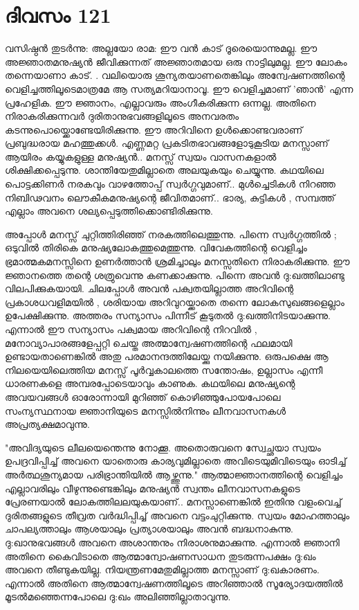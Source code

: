  
\section{ദിവസം 121}


വസിഷ്ഠന്‍ തുടര്‍ന്നു: അല്ലയോ രാമ: ഈ വന്‍ കാട്‌ ദൂരെയൊന്നുമല്ല. ഈ അജ്ഞാതമനുഷ്യന്‍ ജീവിക്കുന്നത്‌ അജ്ഞാതമായ ഒരു നാട്ടിലുമല്ല. ഈ ലോകം തന്നെയാണാ കാട്‌. . വലിയൊരു ശൂന്യതയാണതെങ്കിലും അന്വേഷണത്തിന്റെ വെളിച്ചത്തിലൂടെമാത്രമേ ആ സത്യമറിയാനാവൂ. ഈ വെളിച്ചമാണ്‌ 'ഞാന്‍' എന്ന പ്രഹേളിക. ഈ ജ്ഞാനം, എല്ലാവരും അംഗീകരിക്കുന്ന ഒന്നല്ല. അതിനെ നിരാകരിക്കുന്നവര്‍ ദുരിതാനുഭവങ്ങളിലൂടെ അനവരതം കടന്നുപൊയ്ക്കൊണ്ടേയിരിക്കുന്നു. ഈ അറിവിനെ ഉള്‍ക്കൊണ്ടവരാണ്‌ പ്രബുദ്ധരായ മഹത്തുക്കള്‍.   എണ്ണമറ്റ പ്രകടിതഭാവങ്ങളോടുകൂടിയ മനസ്സാണ്‌ ആയിരം കയ്യുകളുള്ള മനുഷ്യന്‍.. മനസ്സ്‌ സ്വയം വാസനകളാല്‍ ശിക്ഷിക്കപ്പെടുന്നു. ശാന്തിയേതുമില്ലാതെ അലയുകയും ചെയ്യുന്നു. കഥയിലെ പൊട്ടക്കിണര്‍ നരകവും വാഴത്തോപ്പ്‌ സ്വര്‍ഗ്ഗവുമാണ്‌.. മുള്‍ച്ചെടികള്‍ നിറഞ്ഞ നിബിഢവനം ലൌകീകമനുഷ്യന്റെ ജീവിതമാണ്‌.. ഭാര്യ, കുട്ടികള്‍ , സമ്പത്ത്‌ എല്ലാം അവനെ ശല്യപ്പെടുത്തിക്കൊണ്ടിരിക്കുന്നു.

അപ്പോള്‍ മനസ്സ്‌ ചുറ്റിത്തിരിഞ്ഞ്‌ നരകത്തിലെത്തുന്നു. പിന്നെ സ്വര്‍ഗ്ഗത്തില്‍ ; ഒടുവില്‍ തിരികെ മനുഷ്യലോകത്തുമെത്തുന്നു. വിവേകത്തിന്റെ വെളിച്ചം ഭ്രമാത്മകമനസ്സിനെ ഉണര്‍ത്താന്‍ ശ്രമിച്ചാലും മനസ്സതിനെ നിരാകരിക്കുന്നു. ഈ ജ്ഞാനത്തെ തന്റെ ശത്രുവെന്നു കണക്കാക്കുന്നു. പിന്നെ അവന്‍ ദു:ഖത്തിലാണ്ടു വിലപിക്കുകയായി. ചിലപ്പോള്‍ അവന്‍ പക്വതയില്ലാത്ത അറിവിന്റെ പ്രകാശധവളിമയില്‍ , ശരിയായ അറിവുറയ്ക്കാതെ തന്നെ ലോകസുഖങ്ങളെല്ലാം ഉപേക്ഷിക്കുന്നു. അത്തരം സന്യാസം പിന്നീട്‌ കൂടുതല്‍ ദു:ഖത്തിനിടയാക്കുന്നു. എന്നാല്‍ ഈ സന്യാസം പക്വമായ അറിവിന്റെ നിറവില്‍ , മനോവ്യാപാരങ്ങളേപ്പറ്റി ചെയ്ത അത്മാന്വേഷണത്തിന്റെ ഫലമായി ഉണ്ടായതാണെങ്കില്‍ അതു പരമാനന്ദത്തിലേയ്ക്കു നയിക്കുന്നു. ഒരുപക്ഷെ ആ നിലയെയിലെത്തിയ മനസ്സ്‌ പൂര്‍വ്വകാലത്തെ സന്തോഷം, ഉല്ലാസം എന്നീ ധാരണകളെ അമ്പരപ്പോടെയാവും കാണുക. കഥയിലെ മനുഷ്യന്റെ അവയവങ്ങള്‍ ഓരോന്നായി മുറിഞ്ഞ്‌ കൊഴിഞ്ഞുപോയപോലെ സംന്യസ്ഥനായ ജ്ഞാനിയുടെ മനസ്സില്‍നിന്നും ലീനവാസനകള്‍ അപ്രത്യക്ഷമാവുന്നു.

"അവിദ്യയുടെ ലീലയെന്തെന്നു നോക്കൂ. അതൊരുവനെ സ്വേച്ഛയാ സ്വയം ഉപദ്രവിപ്പിച്ച്‌ അവനെ യാതൊരു കാര്യവുമില്ലാതെ അവിടെയുമിവിടെയും ഓടിച്ച്‌ അര്‍ത്ഥശൂന്യമായ പരിഭ്രാന്തിയില്‍ ആഴ്ത്തുന്നു." ആത്മാജ്ഞാനത്തിന്റെ വെളിച്ചം എല്ലാവരിലും വീഴുന്നുണ്ടെങ്കിലും മനുഷ്യന്‍ സ്വന്തം ലീനവാസനകളുടെ പ്രേരണയാല്‍ ലോകത്തിലലയുകയാണ്‌.. മനസ്സാണെങ്കില്‍ ഇതിനു വളംവെച്ച്‌ ദുരിതങ്ങളുടെ തീവ്രത വര്‍ദ്ധിപ്പിച്ച്‌ അവനെ വട്ടംചുറ്റിക്കുന്നു. സ്വയം മോഹത്താലും ചാപല്യത്താലും ആശയാലും പ്രത്യാശയാലും അവന്‍ ബദ്ധനാകുന്നു. ദു:ഖാനുഭവങ്ങള്‍ അവനെ അശാന്തനും നിരാശനുമാക്കുന്നു. എന്നാല്‍ ജ്ഞാനി അതിനെ കൈവിടാതെ ആത്മാന്വോഷണസാധന തുടരുന്നപക്ഷം ദു:ഖം അവനെ തീണ്ടുകയില്ല. നിയന്ത്രണമേതുമില്ലാത്ത മനസ്സാണ്‌ ദു:ഖകാരണം. എന്നാല്‍ അതിനെ ആത്മാന്വേഷണത്തിലൂടെ അറിഞ്ഞാല്‍ സൂര്യോദയത്തില്‍ മൂടല്‍മഞ്ഞെന്നപോലെ ദു:ഖം അലിഞ്ഞില്ലാതാവുന്നു.
